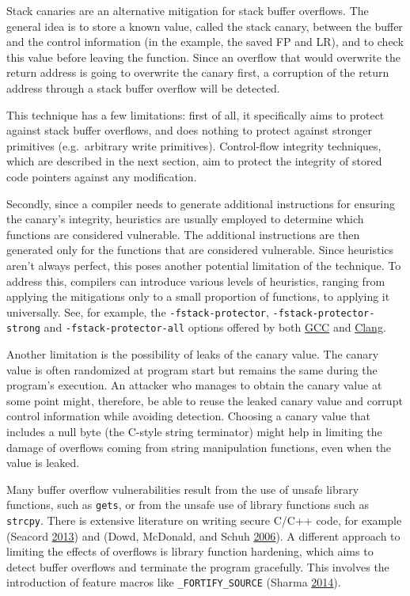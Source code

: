 \documentclass[a4paper,]{report}
\begin{document}
Stack canaries are an alternative mitigation for stack buffer overflows.
The general idea is to store a known value, called the stack canary,
between the buffer and the control information (in the example, the
saved FP and LR), and to check this value before leaving the function.
Since an overflow that would overwrite the return address is going to
overwrite the canary first, a corruption of the return address through a
stack buffer overflow will be detected.

This technique has a few limitations: first of all, it specifically aims
to protect against stack buffer overflows, and does nothing to protect
against stronger primitives (e.g.~arbitrary write primitives).
Control-flow integrity techniques, which are described in the next
section, aim to protect the integrity of stored code pointers against
any modification.

Secondly, since a compiler needs to generate additional instructions for
ensuring the canary's integrity, heuristics are usually employed to
determine which functions are considered vulnerable. The additional
instructions are then generated only for the functions that are
considered vulnerable. Since heuristics aren't always perfect, this
poses another potential limitation of the technique. To address this,
compilers can introduce various levels of heuristics, ranging from
applying the mitigations only to a small proportion of functions, to
applying it universally. See, for example, the
\texttt{-fstack-protector}, \texttt{-fstack-protector-strong} and
\texttt{-fstack-protector-all} options offered by both
\href{https://gcc.gnu.org/onlinedocs/gcc/Instrumentation-Options.html}{GCC}
and
\href{https://clang.llvm.org/docs/ClangCommandLineReference.html\#cmdoption-clang-fstack-protector}{Clang}.

Another limitation is the possibility of leaks of the canary value. The
canary value is often randomized at program start but remains the same
during the program's execution. An attacker who manages to obtain the
canary value at some point might, therefore, be able to reuse the leaked
canary value and corrupt control information while avoiding detection.
Choosing a canary value that includes a null byte (the C-style string
terminator) might help in limiting the damage of overflows coming from
string manipulation functions, even when the value is leaked.

Many buffer overflow vulnerabilities result from the use of unsafe
library functions, such as \texttt{gets}, or from the unsafe use of
library functions such as \texttt{strcpy}. There is extensive literature
on writing secure C/C++ code, for example (Seacord
\protect\hyperlink{ref-Seacord2013}{2013}) and (Dowd, McDonald, and
Schuh \protect\hyperlink{ref-Dowd2006}{2006}). A different approach to
limiting the effects of overflows is library function hardening, which
aims to detect buffer overflows and terminate the program gracefully.
This involves the introduction of feature macros like
\texttt{\_FORTIFY\_SOURCE} (Sharma
\protect\hyperlink{ref-Sharma2014}{2014}).
\end{document}

